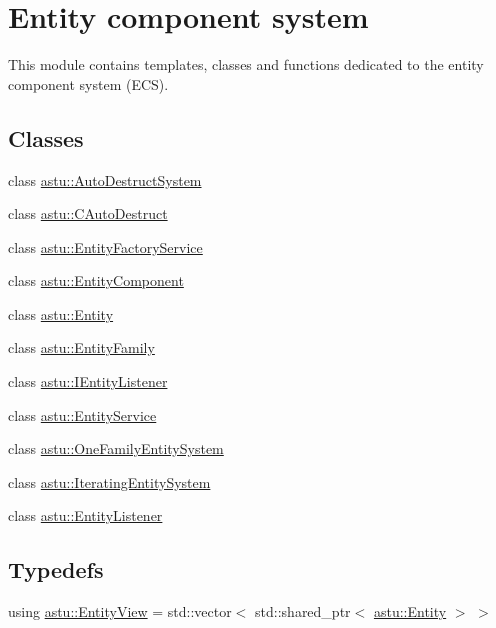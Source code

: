 \hypertarget{group__ecs__group}{}\section{Entity component system}
\label{group__ecs__group}


This module contains templates, classes and functions dedicated to the entity component system (E\+CS).  


\subsection*{Classes}
\begin{DoxyCompactItemize}
\item 
class \hyperlink{classastu_1_1AutoDestructSystem}{astu\+::\+Auto\+Destruct\+System}
\item 
class \hyperlink{classastu_1_1CAutoDestruct}{astu\+::\+C\+Auto\+Destruct}
\item 
class \hyperlink{classastu_1_1EntityFactoryService}{astu\+::\+Entity\+Factory\+Service}
\item 
class \hyperlink{classastu_1_1EntityComponent}{astu\+::\+Entity\+Component}
\item 
class \hyperlink{classastu_1_1Entity}{astu\+::\+Entity}
\item 
class \hyperlink{classastu_1_1EntityFamily}{astu\+::\+Entity\+Family}
\item 
class \hyperlink{classastu_1_1IEntityListener}{astu\+::\+I\+Entity\+Listener}
\item 
class \hyperlink{classastu_1_1EntityService}{astu\+::\+Entity\+Service}
\item 
class \hyperlink{classastu_1_1OneFamilyEntitySystem}{astu\+::\+One\+Family\+Entity\+System}
\item 
class \hyperlink{classastu_1_1IteratingEntitySystem}{astu\+::\+Iterating\+Entity\+System}
\item 
class \hyperlink{classastu_1_1EntityListener}{astu\+::\+Entity\+Listener}
\end{DoxyCompactItemize}
\subsection*{Typedefs}
\begin{DoxyCompactItemize}
\item 
using \hyperlink{group__ecs__group_gace2fb790b86c3908a65e4222f7ac2f4e}{astu\+::\+Entity\+View} = std\+::vector$<$ std\+::shared\+\_\+ptr$<$ \hyperlink{classastu_1_1Entity}{astu\+::\+Entity} $>$ $>$
\end{DoxyCompactItemize}



